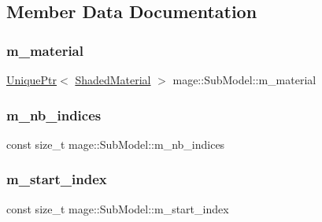 \subsection{Member Data Documentation}
\hypertarget{classmage_1_1_sub_model_a162ac42efa17ae49d14ce0fc42c7449c}{}\label{classmage_1_1_sub_model_a162ac42efa17ae49d14ce0fc42c7449c} 
\subsubsection{\texorpdfstring{m\+\_\+material}{m\_material}}
{\footnotesize\ttfamily \hyperlink{namespacemage_a8c307fbcc33bce9b7f2aa4c26c3b95cf}{Unique\+Ptr}$<$ \hyperlink{structmage_1_1_shaded_material}{Shaded\+Material} $>$ mage\+::\+Sub\+Model\+::m\+\_\+material\hspace{0.3cm}{\ttfamily [private]}}

\hypertarget{classmage_1_1_sub_model_a0471b8b0c4b7be0e696378238b25e7e7}{}\label{classmage_1_1_sub_model_a0471b8b0c4b7be0e696378238b25e7e7} 
\subsubsection{\texorpdfstring{m\+\_\+nb\+\_\+indices}{m\_nb\_indices}}
{\footnotesize\ttfamily const size\+\_\+t mage\+::\+Sub\+Model\+::m\+\_\+nb\+\_\+indices\hspace{0.3cm}{\ttfamily [private]}}

\hypertarget{classmage_1_1_sub_model_a22db3ac71a33ed64a26bb2e4410eeb28}{}\label{classmage_1_1_sub_model_a22db3ac71a33ed64a26bb2e4410eeb28} 
\subsubsection{\texorpdfstring{m\+\_\+start\+\_\+index}{m\_start\_index}}
{\footnotesize\ttfamily const size\+\_\+t mage\+::\+Sub\+Model\+::m\+\_\+start\+\_\+index\hspace{0.3cm}{\ttfamily [private]}}

